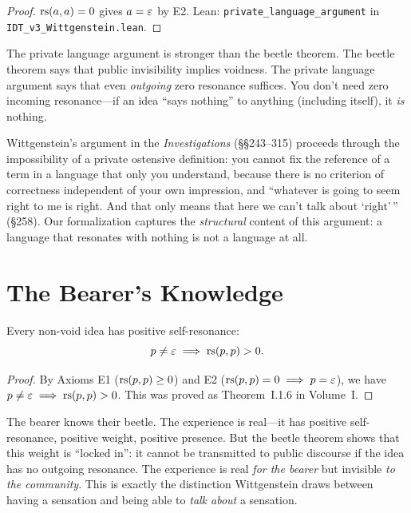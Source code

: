 \begin{proof}
$\mathrm{rs}(a, a) = 0$ gives $a = \varepsilon$ by E2.
Lean: \texttt{private\_language\_argument} in \texttt{IDT\_v3\_Wittgenstein.lean}.
\end{proof}

\begin{interpretation}
The private language argument is stronger than the beetle theorem. The beetle
theorem says that public invisibility implies voidness. The private language
argument says that even \emph{outgoing} zero resonance suffices. You don't
need zero incoming resonance---if an idea ``says nothing'' to anything (including
itself), it \emph{is} nothing.

Wittgenstein's argument in the \textit{Investigations} (\S\S243--315) proceeds
through the impossibility of a private ostensive definition: you cannot fix
the reference of a term in a language that only you understand, because there
is no criterion of correctness independent of your own impression, and ``whatever
is going to seem right to me is right. And that only means that here we can't
talk about `right'\,'' (\S258). Our formalization captures the \emph{structural}
content of this argument: a language that resonates with nothing is not a
language at all.
\end{interpretation}

\section{The Bearer's Knowledge}

\begin{theorem}
\label{thm:bearer-knows}
Every non-void idea has positive self-resonance:
\[
p \neq \varepsilon \implies \mathrm{rs}(p, p) > 0.
\]
\end{theorem}

\begin{proof}
By Axioms E1 ($\mathrm{rs}(p,p) \geq 0$) and E2 ($\mathrm{rs}(p,p) = 0 \implies p = \varepsilon$),
we have $p \neq \varepsilon \implies \mathrm{rs}(p,p) > 0$. This was proved as
Theorem~I.1.6 in Volume~I.
\end{proof}

\begin{interpretation}
The bearer knows their beetle. The experience is real---it has positive
self-resonance, positive weight, positive presence. But the beetle theorem
shows that this weight is ``locked in'': it cannot be transmitted to public
discourse if the idea has no outgoing resonance. The experience is real
\emph{for the bearer} but invisible \emph{to the community}. This is exactly
the distinction Wittgenstein draws between having a sensation and being able
to \emph{talk about} a sensation.
\end{interpretation}

